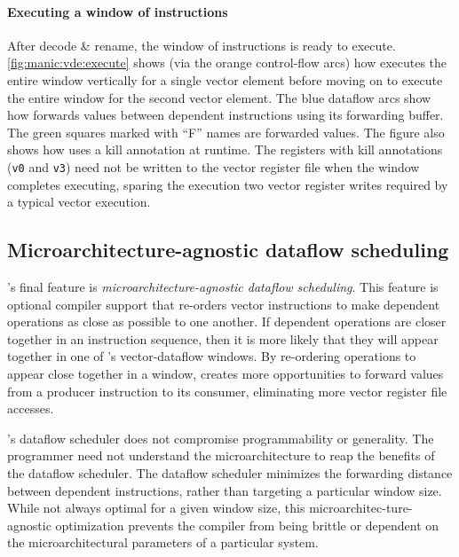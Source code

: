 \paragraph{Executing a window of instructions}
After decode \& rename, the window of instructions is ready to execute.
\autoref{fig:manic:vde:execute} shows (via the orange control-flow arcs) how \manic
executes the entire window vertically for a single vector element before moving
on to execute the entire window for the second vector element.
%
The blue dataflow arcs show how \manic forwards values between dependent
instructions using its forwarding buffer.  The green squares marked with ``F'' names
are forwarded values.
%
The figure also shows how \manic uses a kill annotation at runtime.
%
The registers with kill annotations ({\tt v0} and {\tt v3}) need not be written
to the vector register file when the window completes executing, sparing the
execution two vector register writes required by a typical vector execution. 

\subsection{Microarchitecture-agnostic dataflow scheduling}
\label{manic:design:schedule}
\manic's final feature is {\em microarchitecture-agnostic
dataflow scheduling}.
%
This feature is optional compiler support that
re-orders vector instructions to make dependent operations as close as possible to one another.  If dependent operations are closer together in an instruction
sequence, then it is more likely that they will appear together in one of
\manic's vector-dataflow windows.  By re-ordering operations to appear close
together in a window, \manic creates more opportunities to
forward values from a producer instruction to its consumer,
eliminating more vector register file accesses.

\manic's dataflow scheduler does not compromise programmability or generality.
The programmer need not understand the microarchitecture to reap the benefits
of the dataflow scheduler.  The dataflow scheduler minimizes the forwarding
distance between dependent instructions, rather than targeting a particular
window size.  While not always optimal for a given window size, this
microarchitec-ture-agnostic optimization prevents the compiler from being
brittle or dependent on the microarchitectural parameters of a
particular system. 

